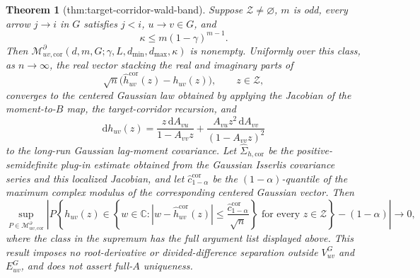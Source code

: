 \documentclass{article}
\newtheorem{theorem}{Theorem}
\begin{document}
\begin{theorem}[thm:target-corridor-wald-band]\label{thm:target-corridor-wald-band}
Suppose \(\mathcal Z\ne\varnothing\), \(m\) is odd, every arrow \(j\to i\) in \(G\) satisfies \(j<i\), \(u\to v\in G\), and
\[
 \kappa\le m(1-\gamma)^{m-1}.
\]
Then \(\mathcal M_{uv,\mathrm{cor}}^{\partial}(d,m,G;\gamma,L,d_{\min},d_{\max},\kappa)\) is nonempty.  Uniformly over this class, as \(n\to\infty\), the real vector stacking the real and imaginary parts of
\[
 \sqrt n\bigl(\widehat h_{uv}^{\mathrm{cor}}(z)-h_{uv}(z)\bigr),
 \qquad z\in\mathcal Z,
\]
converges to the centered Gaussian law obtained by applying the Jacobian of the moment-to-\(B\) map, the target-corridor recursion, and
\[
 \mathrm dh_{uv}(z)
 =\frac{z\,\mathrm dA_{vu}}{1-A_{vv}z}
  +\frac{A_{vu}z^2\,\mathrm dA_{vv}}{(1-A_{vv}z)^2}
\]
to the long-run Gaussian lag-moment covariance.  Let \(\widehat\Sigma_{h,\mathrm{cor}}\) be the positive-semidefinite plug-in estimate obtained from the Gaussian Isserlis covariance series and this localized Jacobian, and let \(\widehat c_{1-\alpha}^{\mathrm{cor}}\) be the \((1-\alpha)\)-quantile of the maximum complex modulus of the corresponding centered Gaussian vector.  Then
\[
 \sup_{P\in\mathcal M_{uv,\mathrm{cor}}^{\partial}}
 \left|
 P\!\left\{
 h_{uv}(z)\in
 \left\{w\in\mathbb C:
 |w-\widehat h_{uv}^{\mathrm{cor}}(z)|
 \le\frac{\widehat c_{1-\alpha}^{\mathrm{cor}}}{\sqrt n}
 \right\}
 \text{ for every }z\in\mathcal Z
 \right\}-(1-\alpha)
 \right|\longrightarrow0,
\]
where the class in the supremum has the full argument list displayed above.  This result imposes no root-derivative or divided-difference separation outside \(V_{uv}^{G}\) and \(E_{uv}^{G}\), and does not assert full-\(A\) uniqueness.
\end{theorem}
\end{document}
